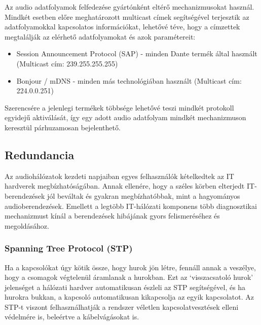 Az audio adatfolyamok felfedezése gyártónként eltérő mechanizmusokat használ. Mindkét esetben 
előre meghatározott multicast címek segítségével terjesztik az adatfolyamokkal kapcsolatos 
információkat, lehetővé téve, hogy a címzettek megtalálják az elérhető adatfolyamokat és azok paramétereit:

\begin{itemize}
	\item Session Announcement Protocol (SAP) - minden Dante termék által használt (Multicast cím: 239.255.255.255)
\end{itemize}

\begin{itemize}
	\item Bonjour / mDNS - minden más technológiában használt (Multicast cím: 224.0.0.251) 
\end{itemize}
Szerencsére a jelenlegi termékek többsége
lehetővé teszi mindkét protokoll egyidejű aktiválását, így egy adott audio
adatfolyam mindkét mechanizmuson keresztül párhuzamosan bejelenthető.

\subsection{Redundancia}
Az audiohálózatok kezdeti napjaiban egyes felhasználók kételkedtek az IT
hardverek megbízhatóságában. Annak ellenére, hogy a széles körben elterjedt
IT-berendezések jól beváltak és gyakran megbízhatóbbak, mint a hagyományos
audioberendezések. Emellett a legtöbb IT-hálózati komponens több diagnosztikai
mechanizmust kínál a berendezések hibájának gyors felismeréséhez és megoldásához.

\subsubsection{Spanning Tree Protocol (STP)}
Ha a kapcsolókat úgy kötik össze, hogy hurok jön létre, fennáll annak a veszélye, 
hogy a csomagok végtelenül áramlanak a hurokban. 
Ezt az `visszacsatoló hurok' jelenséget a hálózati hardver automatikusan észleli az
STP segítségével, és ha hurokra bukkan, a kapcsoló automatikusan kikapcsolja az egyik
kapcsolatot. Az STP-t viszont felhasználhatják a rendszer véletlen
kapcsolatvesztések elleni védelmére is, beleértve a kábelvágásokat is. 

